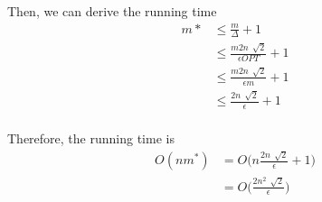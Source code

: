 Then, we can derive the running time
\begin{align*}
	m* &\leq \frac{m}{\Delta} + 1 \\
	&\leq \frac{m2n\,\sqrt[]{2}}{\epsilon OPT}+1 \\
	&\leq \frac{m2n\,\sqrt[]{2}}{\epsilon m}+1 \\
	&\leq \frac{2n\,\sqrt[]{2}}{\epsilon}+1 \\
\end{align*}

Therefore, the running time is
\begin{align*}
	O\left(nm^*\right) &= O\Big(n\frac{2n\,\sqrt[]{2}}{\epsilon}+1 \Big) \\
					&= O\Big(\frac{2n^2\,\sqrt[]{2}}{\epsilon} \Big)
\end{align*}